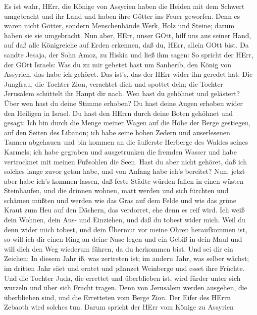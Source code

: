  Es ist wahr, HErr, die Könige von Assyrien haben die
Heiden mit dem Schwert umgebracht und ihr Land  und haben
ihre Götter ins Feuer geworfen. Denn es waren nicht Götter, sondern
Menschenhände Werk, Holz und Steine; darum haben sie sie umgebracht.
 Nun aber, HErr, unser GOtt, hilf uns aus seiner Hand, auf
daß alle Königreiche auf Erden erkennen, daß du, HErr, allein GOtt bist.
 Da sandte Jesaja, der Sohn Amoz, zu Hiskia und ließ ihm
sagen: So spricht der HErr, der GOtt Israels: Was du zu mir gebetet hast
um Sanherib, den König von Assyrien, das habe ich gehöret. 
Das ist's, das der HErr wider ihn geredet hat: Die Jungfrau, die Tochter
Zion, verachtet dich und spottet dein; die Tochter Jerusalem schüttelt
ihr Haupt dir nach.  Wen hast du gehöhnet und gelästert?
Über wen hast du deine Stimme erhoben? Du hast deine Augen erhoben wider
den Heiligen in Israel.  Du hast den HErrn durch deine
Boten gehöhnet und gesagt: Ich bin durch die Menge meiner Wagen auf die
Höhe der Berge gestiegen, auf den Seiten des Libanon; ich habe seine
hohen Zedern und auserlesenen Tannen abgehauen und bin kommen an die
äußerste Herberge des Waldes seines Karmels;  ich habe
gegraben und ausgetrunken die fremden Wasser und habe vertrocknet mit
meinen Fußsohlen die Seen.  Hast du aber nicht gehöret, daß
ich solches lange zuvor getan habe, und von Anfang habe ich's bereitet?
Nun, jetzt aber habe ich's kommen lassen, daß feste Städte würden fallen
in einen wüsten Steinhaufen,  und die drinnen wohnen, matt
werden und sich fürchten und schämen müßten und werden wie das Gras auf
dem Felde und wie das grüne Kraut zum Heu auf den Dächern, das
verdorret, ehe denn es reif wird.  Ich weiß dein Wohnen,
dein Aus- und Einziehen, und daß du tobest wider mich. 
Weil du denn wider mich tobest, und dein Übermut vor meine Ohren
heraufkommen ist, so will ich dir einen Ring an deine Nase legen und ein
Gebiß in dein Maul und will dich den Weg wiederum führen, da du
herkommen bist.  Und sei dir ein Zeichen: In diesem Jahr
iß, was zertreten ist; im andern Jahr, was selber wächst; im dritten
Jahr säet und erntet und pflanzet Weinberge und esset ihre Früchte.
 Und die Tochter Juda, die errettet und überblieben ist,
wird fürder unter sich wurzeln und über sich Frucht tragen.
 Denn von Jerusalem werden ausgehen, die überblieben sind,
und die Erretteten vom Berge Zion. Der Eifer des HErrn Zebaoth wird
solches tun.  Darum spricht der HErr vom Könige zu Assyrien
